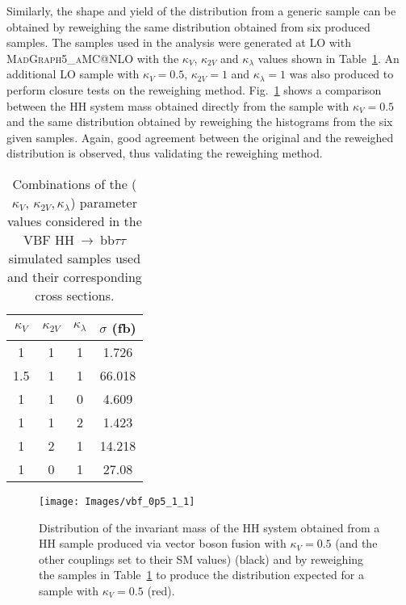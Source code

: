 \documentclass[../main.tex]{subfiles}
\begin{document}
Similarly, the shape and yield of the distribution from a generic sample can be obtained by reweighing the same distribution obtained from six produced samples. The samples used in the analysis were generated at LO with \textsc{MadGraph5\_aMC@NLO} with the $\kappa_V$, $\kappa_{2V}$ and $\kappa_\lambda$ values shown in Table~\ref{hh:analysis:vbf_samples}. An additional LO sample with $\kappa_V=0.5$, $\kappa_{2V}=1$ and $\kappa_{\lambda}=1$ was also produced to perform closure tests on the reweighing method. Fig.~\ref{hh:fig:vbf_rew_test} shows a comparison between the HH system mass obtained directly from the sample with $\kappa_V=0.5$ and the same distribution obtained by reweighing the histograms from the six given samples. Again, good agreement between the original and the reweighed distribution is observed, thus validating the reweighing method. 



\begin{table}[h!]
\begin{center}
\begin{tabular}{c | c | c | c}
$\kappa_V$ & $\kappa_{2V}$ & $\kappa_\lambda$ & $\sigma$ (fb) \\ \hline
1   & 1 & 1 & 1.726 \\
1.5 & 1 & 1 & 66.018 \\
1   & 1 & 0 & 4.609 \\
1   & 1 & 2 & 1.423 \\
1   & 2 & 1 & 14.218 \\
1   & 0 & 1 & 27.08
\end{tabular}
\caption[Parameter values in the HH VBF samples]{Combinations of the ($\kappa_V$, $\kappa_{2V}, \kappa_\lambda$) parameter values considered in the VBF HH$~\to~$bb$\tau\tau$ simulated samples used and their corresponding cross sections.}
\label{hh:analysis:vbf_samples}
\end{center}
\end{table}





\begin{figure}[h!]
\begin{center}
\texttt{[image: Images/vbf\_0p5\_1\_1]}
\end{center}
\caption[HH mass produced via VBF after reweighing]{Distribution of the invariant mass of the HH system obtained from a HH sample produced via vector boson fusion with $\kappa_{V}=0.5$ (and the other couplings set to their SM values) (black)  and by reweighing the samples in Table~\ref{hh:analysis:vbf_samples} to produce the distribution expected for a sample with $\kappa_{V}=0.5$ (red).}
\label{hh:fig:vbf_rew_test}
\end{figure}
\end{document}
